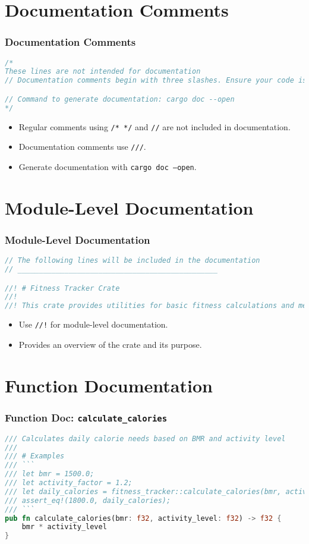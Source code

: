 \documentclass[aspectratio=169, table]{beamer}
\begin{document}
\section{Documentation Comments}
\begin{frame}[fragile]
\frametitle{Documentation Comments}
\begin{lstlisting}[language=Rust]
/* 
These lines are not intended for documentation
// Documentation comments begin with three slashes. Ensure your code is error-free and well-documented before publishing.

// Command to generate documentation: cargo doc --open
*/
\end{lstlisting}
\begin{itemize}
\item Regular comments using \texttt{/* */} and \texttt{//} are not included in documentation.
\item Documentation comments use \texttt{///}.
\item Generate documentation with \texttt{cargo doc --open}.
\end{itemize}
\end{frame}

\section{Module-Level Documentation}
\begin{frame}[fragile]
\frametitle{Module-Level Documentation}
\begin{lstlisting}[language=Rust]
// The following lines will be included in the documentation 
// _______________________________________________

//! # Fitness Tracker Crate
//! 
//! This crate provides utilities for basic fitness calculations and metrics.
\end{lstlisting}
\begin{itemize}
\item Use \texttt{//!} for module-level documentation.
\item Provides an overview of the crate and its purpose.
\end{itemize}
\end{frame}

\section{Function Documentation}
\begin{frame}[fragile]
\frametitle{Function Doc: \texttt{calculate\_calories}}
\begin{lstlisting}[language=Rust]
/// Calculates daily calorie needs based on BMR and activity level
/// 
/// # Examples
/// ``` 
/// let bmr = 1500.0;
/// let activity_factor = 1.2;
/// let daily_calories = fitness_tracker::calculate_calories(bmr, activity_factor);
/// assert_eq!(1800.0, daily_calories); 
/// ```  
pub fn calculate_calories(bmr: f32, activity_level: f32) -> f32 {
	bmr * activity_level
}
\end{lstlisting}
\end{frame}
\end{document}
